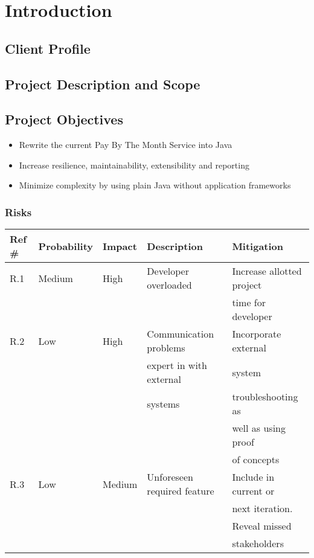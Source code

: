 \section{Introduction}
\subsection{Client Profile}


\subsection{Project Description and Scope}


\subsection{Project Objectives}
\label{Project Objectives}
\begin{itemize}
\item Rewrite the current Pay By The Month Service into Java
\item Increase resilience, maintainability, extensibility and reporting
\item Minimize complexity by using plain Java without application frameworks
\end{itemize}

\subsubsection{Risks}

\begin{tabular}{|l|l|l|l|l|}
\hline
{\bf Ref \#} & {\bf Probability} & {\bf Impact} & {\bf Description} & {\bf Mitigation} \\
\hline
R.1 & Medium & High & Developer overloaded & Increase allotted project \\ & & & & time for developer \\
\hline
R.2 & Low & High & Communication problems & Incorporate external  \\  & & & expert in with external & system \\  & & & systems & troubleshooting as \\ & & & & well as using  proof \\ & & & &  of concepts \\ 
\hline
R.3 & Low & Medium & Unforeseen required feature & Include in current or \\ & & & &  next iteration. \\ & & & & Reveal missed \\ & & & & stakeholders \\
\hline
\end{tabular}

